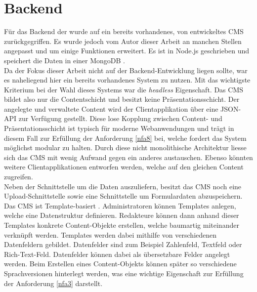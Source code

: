 \section{Backend}
\label{sec:backend}

Für das Backend der \shst{} wurde auf ein bereits vorhandenes, von \meso{} entwickeltes
CMS zurückgegriffen. Es wurde jedoch vom Autor dieser Arbeit
an manchen Stellen angepasst und um einige Funktionen
erweitert. Es ist in Node.js \cite{node} geschrieben und speichert die Daten in einer 
MongoDB \cite{mongo}.\\
Da der Fokus dieser Arbeit nicht auf der Backend-Entwicklung liegen sollte, war es 
naheliegend hier ein bereits vorhandenes System zu nutzen. Mit das wichtigste Kriterium
bei der Wahl dieses Systems war die \emph{headless} Eigenschaft. Das CMS bildet also nur 
die Contentschicht und besitzt keine Präsentationsschicht. Der angelegte und verwaltete
Content wird der Clientapplikation über eine JSON-API zur Verfügung gestellt. 
Diese lose Kopplung zwischen Content- und Präsentationsschicht ist typisch für moderne
Webanwendungen und trägt in diesem Fall zur Erfüllung der Anforderung \ref{nfa8} bei,
welche fordert das System möglichst modular zu halten. Durch diese nicht monolithische 
Architektur liesse sich das CMS mit wenig Aufwand gegen ein anderes austauschen. Ebenso
könnten weitere Clientapplikationen entworfen werden, welche auf den gleichen Content
zugreifen.\\
Neben der Schnittstelle um die Daten auszuliefern, besitzt das CMS noch eine
Upload-Schnittstelle sowie eine Schnittstelle um Formulardaten abzuspeichern.\\

Das CMS ist Template-basiert . Administratoren können Templates 
anlegen, welche eine Datenstruktur definieren. Redakteure können dann anhand dieser Templates 
konkrete Content-Objekte erstellen, welche baumartig miteinander verknüpft werden. Templates 
werden dabei mithilfe von verschiedenen Datenfeldern gebildet. Datenfelder sind zum Beispiel
Zahlenfeld, Textfeld oder Rich-Text-Feld. Datenfelder können dabei als übersetzbare Felder angelegt
werden. Beim Erstellen eines Content-Objekts können später so verschiedene Sprachversionen
hinterlegt werden, was eine wichtige Eigenschaft zur Erfüllung der Anforderung \ref{nfa3}
darstellt.\\



\iffalse
Template-basiert
Admins können Templates mit Datenstruktur erstellen
Redakteure können Objekte anhand von Templates erstellen
Sharing Station gibt Templates für Menü oder Modul
Navigationsstruktur der Oberfläche ist Baumartig - so sind auch die Daten
\fi